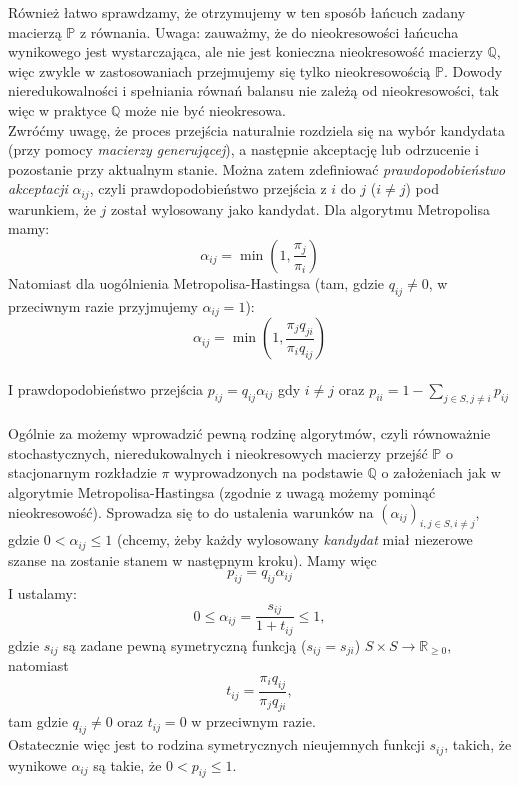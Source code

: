 \documentclass[a4paper]{article}
\theoremstyle{defn}
\theoremstyle{theorem}
\theoremstyle{lemma}
\theoremstyle{cor}
\theoremstyle{fact}
\begin{document}
Również łatwo sprawdzamy, że otrzymujemy w ten sposób łańcuch zadany macierzą $\mathbb{P}$ z równania. Uwaga: zauważmy, że do nieokresowości łańcucha wynikowego jest wystarczająca, ale nie jest konieczna nieokresowość macierzy $\mathbb{Q}$, więc zwykle w zastosowaniach przejmujemy się tylko nieokresowością $\mathbb{P}$. Dowody nieredukowalności i spełniania równań balansu nie zależą od nieokresowości, tak więc w praktyce $\mathbb{Q}$ może nie być nieokresowa. \\
Zwróćmy uwagę, że proces przejścia naturalnie rozdziela się na wybór kandydata (przy pomocy \textit{macierzy generującej}), a następnie akceptację lub odrzucenie i pozostanie przy aktualnym stanie. Można zatem zdefiniować \textit{prawdopodobieństwo akceptacji} $\alpha_{ij}$, czyli prawdopodobieństwo przejścia z $i$ do $j$ ($i \neq j$) pod warunkiem, że $j$ został wylosowany jako kandydat. Dla algorytmu Metropolisa mamy:
$$\alpha_{ij} = \min(1, \frac{\pi_j}{\pi_i})$$
Natomiast dla uogólnienia Metropolisa-Hastingsa (tam, gdzie $q_{ij} \neq 0$, w przeciwnym razie przyjmujemy $\alpha_{ij} = 1$):
$$\alpha_{ij} = \min(1, \frac{\pi_j q_{ji}}{\pi_i q_{ij}})$$
\\
I prawdopodobieństwo przejścia $p_{ij} = q_{ij}\alpha_{ij}$ gdy $i \neq j$ oraz $p_{ii} = 1 - \sum\limits_{j \in S, j \neq i} p_{ij}$\\\\
Ogólnie za \cite{hastings} możemy wprowadzić pewną rodzinę algorytmów, czyli równoważnie stochastycznych, nieredukowalnych i nieokresowych macierzy przejść $\mathbb{P}$ o stacjonarnym rozkładzie $\pi$ wyprowadzonych na podstawie $\mathbb{Q}$ o założeniach jak w algorytmie Metropolisa-Hastingsa (zgodnie z uwagą możemy pominąć nieokresowość). Sprowadza się to do ustalenia warunków na $(\alpha_{ij})_{i,j \in S, i \neq j}$, gdzie $0 < \alpha_{ij} \leq 1$ (chcemy, żeby każdy wylosowany \textit{kandydat} miał niezerowe szanse na zostanie stanem w następnym kroku). Mamy więc  $$p_{ij} = q_{ij}\alpha_{ij}$$
I ustalamy:
$$ 0 \leq \alpha_{ij} = \frac{s_{ij}}{1+t_{ij}} \leq 1,$$
gdzie  $s_{ij}$ są zadane pewną symetryczną funkcją ($s_{ij} = s_{ji}$) $S \times S \to \mathbb{R}_{\geq 0}$, natomiast $$t_{ij} = \frac{\pi_i q_{ij}}{\pi_j q_{ji}},$$
tam gdzie $q_{ij} \neq 0$ oraz $t_{ij} = 0$ w przeciwnym razie.\\

Ostatecznie więc jest to rodzina symetrycznych nieujemnych funkcji $s_{ij}$, takich, że wynikowe $\alpha_{ij}$ są takie, że $0 < p_{ij} \leq 1$.\\
\end{document}
